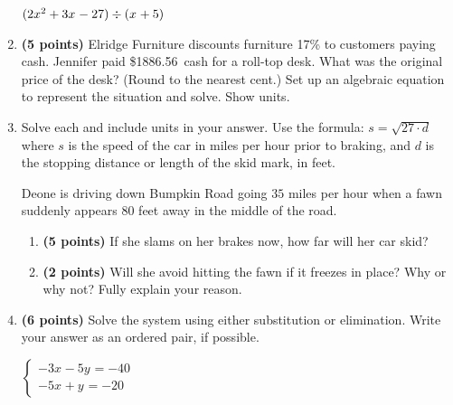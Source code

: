 \documentclass[12pt]{amsart}
\begin{document}
\begin{enumerate}
$(2x^{2}+3x^{}-27) \div (x^{}+5)$

\vfill  \vfill \vfill
\newpage\def \discount{17}\def \paid{1886.56}\def \rainy{10.52}\def \orcost{2272.96}\def \purcost{1612.44}\def \orrainy{12.67}
\item {\bf (5 points)} 
 Elridge Furniture discounts furniture \discount\% to customers paying cash. Jennifer paid \$\paid\ cash for a roll-top desk. What was the original price of the desk? (Round to the nearest cent.) Set up an algebraic equation to represent the situation and solve. Show units.

\vfill 
\def \insvar{27}\def \d{80}\def \zerospeed{46.48}\def \slimit{35}\def \s{56}\def \skidd{116.148}\def \safed{45.37}\def \rsafed{45}

 
\item Solve each and include units in your answer. Use the formula: $s = \sqrt{\insvar \cdot d}$ where $s$ is the speed of the car in miles per hour prior to braking, and $d$ is the stopping distance or length of the skid mark, in feet. 

\vspace{3mm}

Deone is driving down Bumpkin Road going $\slimit$ miles per hour when a fawn suddenly appears $\d$ feet away in the middle of the road. \begin{enumerate}
\item {\bf (5 points)} If she slams on her brakes now, how far will her car skid? \vspace{4cm}
\item {\bf (2 points)} Will she avoid hitting the fawn if it freezes in place? Why or why not? Fully explain your reason. \vspace{3cm}
\end{enumerate}


\newpage\def \xis{5}\def \yis{5}\def \nomatcho{[2,3,5,2]}\def \a{-2}\def \c{-3}\def \b{-5}\def \d{2}\def \polyonesol{-35}\def \polytwosol{-5}\def \xgoodone{-2x^{}}\def \ygoodone{-5y^{}}\def \xgoodtwo{-3x^{}}\def \ygoodtwo{+2y^{}}\def \unitize{[0,0,0,1,0,1]}\def \mtem{-3}\def \ntem{-5}\def \ptem{-5}\def \qtem{3}\def \m{-3}\def \n{-5}\def \p{-5}\def \q{1}\def \polytonesol{-40}\def \polyttwosol{-20}\def \xtgoodone{-3x^{}}\def \ytgoodone{-5y^{}}\def \xtgoodtwo{-5x^{}}\def \ytgoodtwo{+y^{}}
\item {\bf (6 points)} 
 Solve the system using either substitution or elimination. Write your answer as an ordered pair, if possible. 

$ \begin{cases} \xtgoodone \ytgoodone = \polytonesol \\
\xtgoodtwo \ytgoodtwo = \polyttwosol
\end{cases}$


\end{enumerate}
\end{document}
